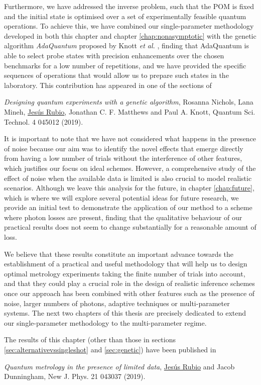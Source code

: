 Furthermore, we have addressed the inverse problem, such that the POM is fixed and the initial state is optimised over a set of experimentally feasible quantum operations. To achieve this, we have combined our single-parameter methodology developed in both this chapter and chapter \ref{chap:nonasymptotic} with the genetic algorithm \emph{AdaQuantum} proposed by Knott \emph{et al.} \cite{jesus2018dec}, finding that AdaQuantum is able to select probe states with precision enhancements over the chosen benchmarks for a low number of repetitions, and we have provided the specific sequences of operations that would allow us to prepare such states in the laboratory. This contribution has appeared in one of the sections of \cite{jesus2018dec}
\begin{displayquote}
\emph{Designing quantum experiments with a genetic algorithm}, Rosanna Nichols, Lana Mineh, \underline{Jes\'{u}s Rubio}, Jonathan C. F. Matthews and Paul A. Knott, Quantum Sci. Technol. 4 045012 (2019).
\end{displayquote}

It is important to note that we have not considered what happens in the presence of noise because our aim was to identify the novel effects that emerge directly from having a low number of trials without the interference of other features, which justifies our focus on ideal schemes. However, a comprehensive study of the effect of noise when the available data is limited is also crucial to model realistic scenarios. Although we leave this analysis for the future, in chapter \ref{chap:future}, which is where we will explore several potential ideas for future research, we provide an initial test to demonstrate the application of our method to a scheme where photon losses are present, finding that the qualitative behaviour of our practical results does not seem to change substantially for a reasonable amount of loss. 

We believe that these results constitute an important advance towards the establishment of a practical and useful methodology that will help us to design optimal metrology experiments taking the finite number of trials into account, and that they could play a crucial role in the design of realistic inference schemes once our approach has been combined with other features such as the presence of noise, larger numbers of photons, adaptive techniques or multi-parameter systems. The next two chapters of this thesis are precisely dedicated to extend our single-parameter methodology to the multi-parameter regime. 

The results of this chapter (other than those in sections \ref{sec:alternativevssingleshot} and \ref{sec:genetic}) have been published in \cite{jesus2018}
\begin{displayquote}
\emph{Quantum metrology in the presence of limited data}, \underline{Jes\'{u}s Rubio} and Jacob Dunningham, New J. Phys. 21 043037 (2019).
\end{displayquote}